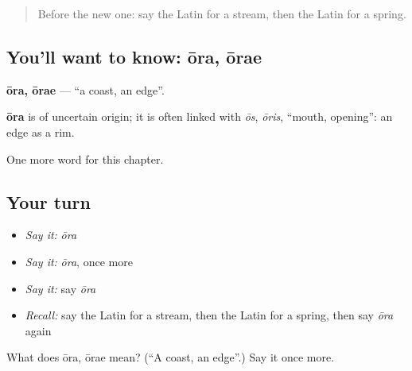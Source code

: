 \begin{quote}
Before the new one: say the Latin for a stream, then the Latin for a spring.
\end{quote}

\subsection*{You'll want to know: ōra, ōrae}
\textbf{ōra, ōrae} — \textquotedblleft{}a coast, an edge\textquotedblright{}.

\begin{cousinweb}
\textbf{ōra} is of uncertain origin; it is often linked with \emph{ōs}, \emph{ōris}, \textquotedblleft{}mouth, opening\textquotedblright{}: an edge as a rim.
\end{cousinweb}

\begin{grammarlens}[title={What you've built}]
One more word for this chapter.
\end{grammarlens}

\subsection*{Your turn}
\begin{itemize}
\raggedright
  \item \emph{Say it:} \emph{ōra}
  \item \emph{Say it:} \emph{ōra}, once more
  \item \emph{Say it:} say \emph{ōra}
  \item \emph{Recall:} say the Latin for a stream, then the Latin for a spring, then say \emph{ōra} again
\end{itemize}

\begin{tcolorbox}[breakable,colback=teal!4,colframe=teal!35!black,title={Before you move on}]
What does ōra, ōrae mean? (\textquotedblleft{}A coast, an edge\textquotedblright{}.) Say it once more.
\end{tcolorbox}
